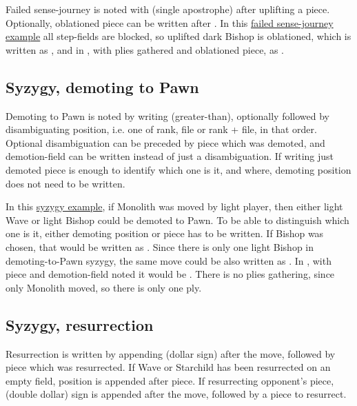 Failed sense-journey is noted with  (single apostrophe) after uplifting a
piece. Optionally, oblationed piece can be written after . In this
\hyperref[fig:scn_o_46_sense_journey_failed]{failed sense-journey example} all
step-fields are blocked, so uplifted dark Bishop is oblationed, which is written as
, and in , with plies gathered and oblationed piece,
as .

\subsection*{Syzygy, demoting to Pawn}
\label{sec:Appendix/Notation/Syzygy, demoting to Pawn}

Demoting to Pawn is noted by writing \alg{>} (greater-than), optionally followed by
disambiguating position, i.e. one of rank, file or rank + file, in that order. Optional
disambiguation can be preceded by piece which was demoted, and demotion-field can be
written instead of just a disambiguation. If writing just demoted piece is enough to
identify which one is it, and where, demoting position does not need to be written.

In this \hyperref[fig:scn_d_22_syzygy_2_stars_init]{syzygy example}, if Monolith was
moved by light player, then either light Wave or light Bishop could be demoted to Pawn.
To be able to distinguish which one is it, either demoting position or piece has to be
written. If Bishop was chosen, that would be written as . Since there is
only one light Bishop in demoting-to-Pawn syzygy, the same move could be also written
as . In , with piece and demotion-field noted it would be
. There is no plies gathering, since only Monolith moved, so there
is only one ply.

\subsection*{Syzygy, resurrection}
\label{sec:Appendix/Notation/Syzygy, resurrection}

Resurrection is written by appending \alg{\$} (dollar sign) after the move, followed by
piece which was resurrected. If Wave or Starchild has been resurrected on an empty field,
position is appended after piece. If resurrecting opponent's piece, \alg{\$\$} (double
dollar) sign is appended after the move, followed by a piece to resurrect.

